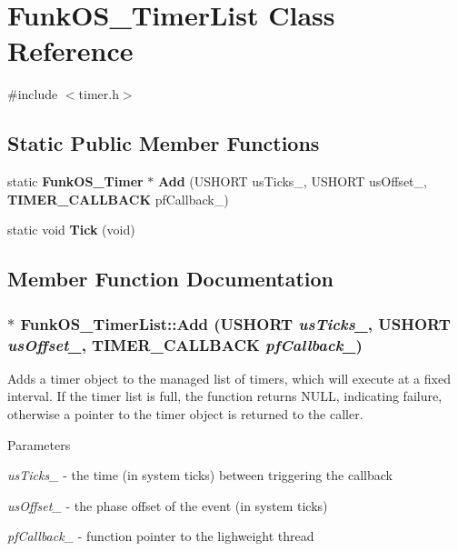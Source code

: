 \section{FunkOS\_\-TimerList Class Reference}
\label{class_funk_o_s___timer_list}


{\ttfamily \#include $<$timer.h$>$}\subsection*{Static Public Member Functions}
\begin{DoxyCompactItemize}
\item 
static {\bf FunkOS\_\-Timer} $\ast$ {\bf Add} (USHORT usTicks\_\-, USHORT usOffset\_\-, {\bf TIMER\_\-CALLBACK} pfCallback\_\-)
\item 
static void {\bf Tick} (void)
\end{DoxyCompactItemize}


\subsection{Member Function Documentation}
\subsubsection[{Add}]{ $\ast$ FunkOS\_\-TimerList::Add (USHORT {\em usTicks\_\-}, \/  USHORT {\em usOffset\_\-}, \/  {\bf TIMER\_\-CALLBACK} {\em pfCallback\_\-})\hspace{0.3cm}{\ttfamily  [static]}}\label{class_funk_o_s___timer_list_aadd8d6e1250961740f9f5b1dc1f7df07}
Adds a timer object to the managed list of timers, which will execute at a fixed interval. If the timer list is full, the function returns NULL, indicating failure, otherwise a pointer to the timer object is returned to the caller.


\begin{DoxyParams}{Parameters}
\item[{\em usTicks\_\-}]-\/ the time (in system ticks) between triggering the callback \item[{\em usOffset\_\-}]-\/ the phase offset of the event (in system ticks) \item[{\em pfCallback\_\-}]-\/ function pointer to the lighweight thread \end{DoxyParams}
